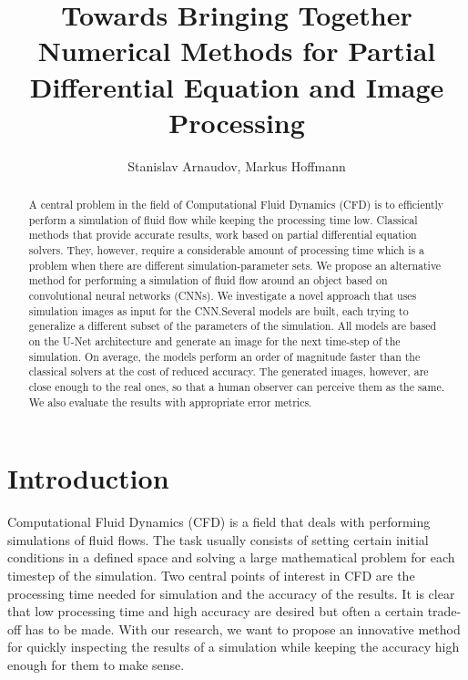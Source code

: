 \documentclass{llncs}
\begin{document}
\pagestyle{headings}
\mainmatter
\def\ECCVSubNumber{100}
\title{Towards Bringing Together Numerical Methods for Partial Differential Equation and Image Processing}
\author{Stanislav Arnaudov, Markus Hoffmann}

\maketitle

\begin{abstract}
A central problem in the field of Computational Fluid Dynamics (CFD) is to efficiently perform a simulation of fluid flow while keeping the processing time low. Classical methods that provide accurate results, work based on partial differential equation solvers. They, however, require a considerable amount of processing time which is a problem when there are different simulation-parameter sets. We propose an alternative method for performing a simulation of fluid flow around an object based on convolutional neural networks (CNNs). We investigate a novel approach that uses simulation images as input for the CNN.\@ Several models are built, each trying to generalize a different subset of the parameters of the simulation. All models are based on the U-Net architecture and generate an image for the next time-step of the simulation. On average, the models perform an order of magnitude faster than the classical solvers at the cost of reduced accuracy. The generated images, however, are close enough to the real ones, so that a human observer can perceive them as the same. We also evaluate the results with appropriate error metrics.
\end{abstract}


\section{Introduction}\label{introduction}
Computational Fluid Dynamics (CFD) is a field that deals with performing simulations of fluid flows. The task usually consists of setting certain initial conditions in a defined space and solving a large mathematical problem for each timestep of the simulation. Two central points of interest in CFD are the processing time needed for simulation and the accuracy of the results. It is clear that low processing time and high accuracy are desired but often a certain trade-off has to be made. With our research, we want to propose an innovative method for quickly inspecting the results of a simulation while keeping the accuracy high enough for them to make sense.
\end{document}
